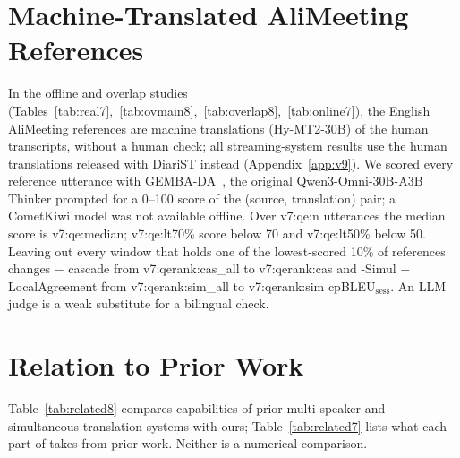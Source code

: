 \section{Machine-Translated AliMeeting References}
\label{app:qe7}

In the offline and overlap studies (Tables~\ref{tab:real7},~\ref{tab:ovmain8},~\ref{tab:overlap8},~\ref{tab:online7}),
the English AliMeeting references are machine translations (Hy-MT2-30B) of the human transcripts, without a human check;
all streaming-system results use the human translations released with DiariST instead (Appendix~\ref{app:v9}). We scored every reference utterance with GEMBA-DA~\citep{kocmi2023large}, the original
Qwen3-Omni-30B-A3B Thinker prompted for a 0--100 score of the (source, translation) pair; a CometKiwi model was not
available offline. Over \num{v7:qe:n} utterances the median score is \num{v7:qe:median}; \num{v7:qe:lt70}\% score below 70
and \num{v7:qe:lt50}\% below 50. Leaving out every window that holds one of the lowest-scored 10\% of references changes
\sys{} $-$ cascade from \num{v7:qerank:cas_all} to \num{v7:qerank:cas} and \sys{}-Simul $-$ LocalAgreement from
\num{v7:qerank:sim_all} to \num{v7:qerank:sim} cpBLEU$_\text{sess}$. An LLM judge is a weak substitute for a bilingual check.

\section{Relation to Prior Work}
\label{app:related7}

Table~\ref{tab:related8} compares capabilities of prior multi-speaker and simultaneous translation systems with ours;
Table~\ref{tab:related7} lists what each part of \sys{} takes from prior work. Neither is a numerical comparison.

